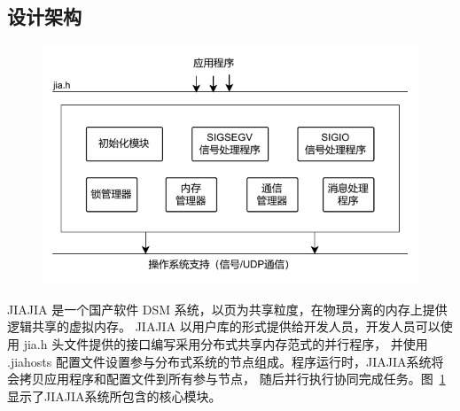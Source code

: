{    \subsection{设计架构}
    \begin{figure}[!htbp]
        \centering
        \includegraphics[width=\textwidth]{Img/JIAJIA 设计架构.drawio.pdf}
        \label{fig:JIAJIA-design}
    \end{figure}
    JIAJIA 是一个国产软件 DSM 系统，以页为共享粒度，在物理分离的内存上提供逻辑共享的虚拟内存。
    JIAJIA 以用户库的形式提供给开发人员，开发人员可以使用 jia.h 头文件提供的接口编写采用分布式共享内存范式的并行程序，
    并使用 .jiahosts 配置文件设置参与分布式系统的节点组成。程序运行时，JIAJIA系统将会拷贝应用程序和配置文件到所有参与节点，
    随后并行执行协同完成任务。图~\ref{fig:JIAJIA-design} 显示了JIAJIA系统所包含的核心模块。

}
